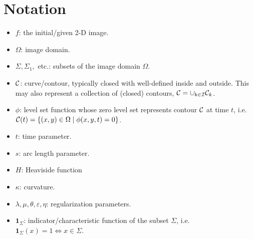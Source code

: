 \section{Notation}
\begin{itemize}
	\item $f$: the initial/given 2-D image.
	
	\item $\Omega$: image domain.
	
	\item $\Sigma, \Sigma_1,$ etc.: subsets of the image domain $\Omega$.
	
	\item $\mathcal{C}$: curve/contour, typically closed with well-defined inside and outside. This may also represent a collection of (closed) contours, $\mathcal{C} = \cup_{k \in \mathcal{I}} \mathcal{C}_k$.
	
	\item $\phi$: level set function whose zero level set represents contour $\mathcal{C}$ at time $t$, i.e. $\mathcal{C}(t) = \{(x,y) \in \Omega \mid \phi(x,y,t) = 0\}$. 
	
	\item $t$: time parameter. 
	
	\item $s$: arc length parameter.
	
	\item $H$: Heaviside function
	
	\item $\kappa$: curvature. 
	
	\item $\lambda, \mu, \theta, \varepsilon, \eta$: regularization parameters.
	
	\item $\mathbf{1}_\Sigma$: indicator/characteristic function of the subset $\Sigma$, i.e. $\mathbf{1}_\Sigma(x) = 1 \iff x \in \Sigma$.
	
\end{itemize}